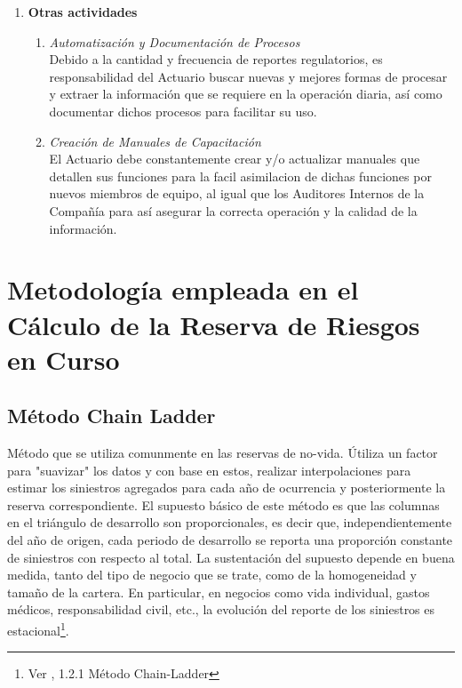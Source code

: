 \documentclass[11pt,twoside,openright,spanish]{report}
\numberwithin{equation}{chapter}
\numberwithin{figure}{chapter}
\numberwithin{table}{chapter}
\begin{document}
\begin{singlespace}
\begin{enumerate}
		\item \textbf{Otras actividades}
		\begin{enumerate}
			\item \textit{Automatización y Documentación de Procesos} \\ \-\hspace{0.5cm}
			Debido a la cantidad y frecuencia de reportes regulatorios, es responsabilidad del Actuario buscar nuevas y mejores formas de procesar y extraer la información que se requiere en la operación diaria, así como documentar dichos procesos para facilitar su uso.
			\item \textit{Creación de Manuales de Capacitación} \\ \-\hspace{0.5cm}
			El Actuario debe constantemente crear y/o actualizar manuales que detallen sus funciones para la facil asimilacion de dichas funciones por nuevos miembros de equipo, al igual que los Auditores Internos de la Compañía para así asegurar la correcta operación y la calidad de la información.
		\end{enumerate}
	\end{enumerate}
\end{singlespace}


	\chapter{Metodología empleada en el Cálculo de la Reserva de Riesgos en Curso}\label{tcyedb}
	
	\section{Método Chain Ladder}

	Método que se utiliza comunmente en las reservas de no-vida. Útiliza un factor para "suavizar" los datos y con base en estos, realizar interpolaciones para estimar los siniestros agregados para cada año de ocurrencia y posteriormente la reserva correspondiente. El supuesto básico de este método es que las columnas en el triángulo de desarrollo son proporcionales, es decir que, independientemente del año de origen, cada periodo de desarrollo se reporta una proporción constante de siniestros con respecto al total. La sustentación del supuesto depende en buena medida, tanto del tipo de negocio que se trate, como de la homogeneidad y tamaño de la cartera. En particular, en negocios como vida individual, gastos médicos, responsabilidad civil, etc., la evolución del reporte de los siniestros es estacional\footnote{Ver \citet{LChainLadder}, 1.2.1 Método Chain-Ladder}.  
\end{document}
